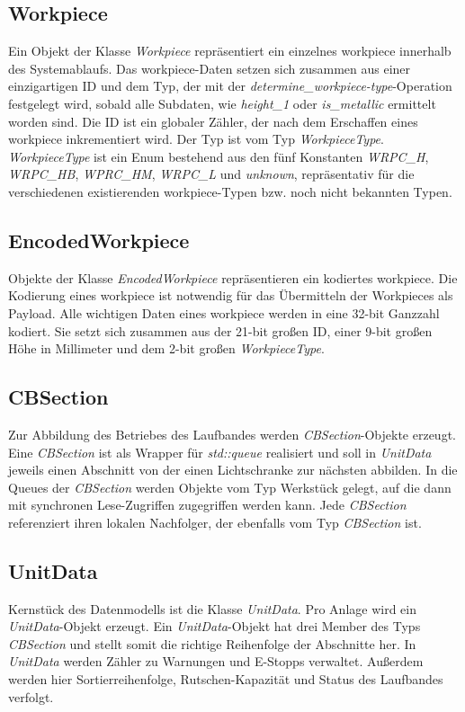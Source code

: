 \subsection{Workpiece}
Ein Objekt der Klasse \textit{Workpiece} repräsentiert ein einzelnes \gls{workpiece} innerhalb des Systemablaufs.
Das \gls{workpiece}-Daten setzen sich zusammen aus einer einzigartigen ID und dem Typ, der mit der \textit{determine_workpiece-type}-Operation
festgelegt wird, sobald alle Subdaten, wie \textit{height_1} oder \textit{is_metallic} ermittelt worden sind.
Die ID ist ein globaler Zähler, der nach dem Erschaffen eines \gls{workpiece} inkrementiert wird.
Der Typ ist vom Typ \textit{WorkpieceType}.
\textit{WorkpieceType} ist ein Enum bestehend aus den fünf Konstanten \textit{WRPC_H},
\textit{WRPC_HB}, \textit{WPRC_HM}, \textit{WRPC_L} und \textit{unknown},
repräsentativ für die verschiedenen existierenden \gls{workpiece}-Typen bzw. noch nicht bekannten Typen.

\subsection{EncodedWorkpiece}
Objekte der Klasse \textit{EncodedWorkpiece} repräsentieren ein kodiertes \gls{workpiece}.
Die Kodierung eines \gls{workpiece} ist notwendig für das Übermitteln der Workpieces als Payload.
Alle wichtigen Daten eines \gls{workpiece} werden in eine 32-bit Ganzzahl kodiert.
Sie setzt sich zusammen aus der 21-bit großen ID, einer 9-bit großen Höhe in Millimeter und
dem 2-bit großen \textit{WorkpieceType}.

\subsection{CBSection}
Zur Abbildung des Betriebes des Laufbandes werden \textit{CBSection}-Objekte erzeugt.
Eine \textit{CBSection} ist als Wrapper für \textit{std::queue} realisiert und soll in \textit{UnitData}
jeweils einen Abschnitt von der einen Lichtschranke zur nächsten abbilden.
In die Queues der \textit{CBSection} werden Objekte vom Typ Werkstück gelegt, auf die dann mit synchronen
Lese-Zugriffen zugegriffen werden kann.
Jede \textit{CBSection} referenziert ihren lokalen Nachfolger, der ebenfalls vom Typ \textit{CBSection} ist.

\subsection{UnitData}
Kernstück des Datenmodells ist die Klasse \textit{UnitData}. Pro Anlage wird ein \textit{UnitData}-Objekt
erzeugt.
Ein \textit{UnitData}-Objekt hat drei Member des Typs \textit{CBSection} und stellt somit die richtige
Reihenfolge der Abschnitte her.
In \textit{UnitData} werden Zähler zu Warnungen und E-Stopps verwaltet.
Außerdem werden hier Sortierreihenfolge, Rutschen-Kapazität und Status des Laufbandes verfolgt.

